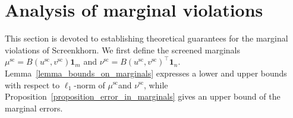 
\section{Analysis of marginal violations} %
\label{sec:analysis_of_marginal_violations}

This section is devoted to establishing theoretical guarantees for the marginal violations of Screenkhorn. 
We first define the screened marginals $\mu^{\text{sc}} = B(u^{\text{sc}}, v^{\text{sc}}) \mathbf 1_m$ and $\nu^{\text{sc}} = B(u^{\text{sc}}, v^{\text{sc}})^\top \mathbf 1_n.$ 
Lemma~\ref{lemma_bounds_on_marginals} expresses a lower and upper bounds with respect to $\ell_1$-norm of $\mu^{\text{sc}}$and $\nu^{\text{sc}}$, while Proposition~\ref{proposition_error_in_marginals} gives an upper bound of the marginal errors.


